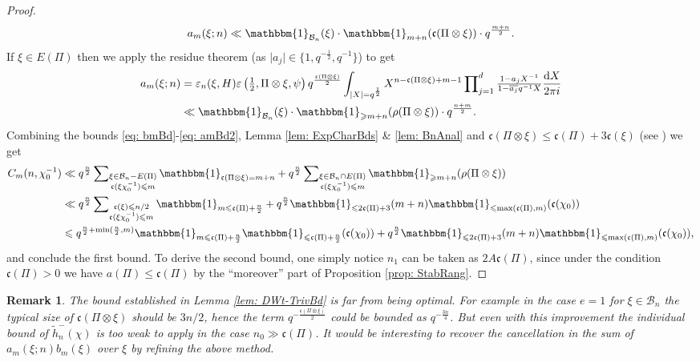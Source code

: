 \documentclass[A4]{amsart}
\def\leq{\leqslant}
\def\geq{\geqslant}
\newtheorem{remark} [theorem] {Remark}
\numberwithin{equation}{section} \everymath{\displaystyle}
\newcommand{\id}{\mathbbm{1}}
\newcommand{\ud}{\mathrm{d}}
\newcommand{\norm}[1][\cdot]{\lvert #1 \rvert}
\newcommand{\cond}{\mathfrak{c}}
\newcommand{\condL}{\mathfrak{\rho}}
\begin{document}
\begin{proof}
\begin{equation} \label{eq: amBd1} 
	a_m(\xi;n) \ll \id_{\mathcal{B}_n}(\xi) \cdot \id_{m+n}(\cond(\Pi \otimes \xi)) \cdot q^{\frac{m+n}{2}}. 
\end{equation}
	If $\xi \in E(\Pi)$ then we apply the residue theorem (as $\norm[a_j] \in \{ 1, q^{-\frac{1}{2}}, q^{-1} \}$) to get
\begin{align}
	a_m(\xi;n) &= \varepsilon_n(\xi, H) \varepsilon \left( \tfrac{1}{2}, \Pi \otimes \xi, \psi \right) q^{\frac{\cond(\Pi \otimes \xi)}{2}} \int_{\norm[X]=q^{\frac{1}{2}}} X^{n-\cond(\Pi \otimes \xi)+m-1} \sideset{}{_{j=1}^d} \prod \tfrac{1-a_j X^{-1}}{1-\overline{a_j}q^{-1}X} \frac{\ud X}{2\pi i} \nonumber \\
	&\ll \id_{\mathcal{B}_n}(\xi) \cdot \id_{\geq m+n}(\condL(\Pi \otimes \xi)) \cdot q^{\frac{n+m}{2}}. \label{eq: amBd2}
\end{align}
	Combining the bounds \eqref{eq: bmBd}-\eqref{eq: amBd2}, Lemma \ref{lem: ExpCharBds} \& \ref{lem: BnAnal} and $\cond(\Pi \otimes \xi) \leq \cond(\Pi)+3\cond(\xi)$ (see \cite{BuH97}) we get
\begin{align*}
	C_m(n,\chi_0^{-1}) &\ll q^{\frac{n}{2}} \sideset{}{_{\substack{\xi \in \mathcal{B}_n - E(\Pi) \\ \cond(\xi \chi_0^{-1}) \leq m}}} \sum \id_{\cond(\Pi \otimes \xi) = m+n} + q^{\frac{n}{2}} \sideset{}{_{\substack{\xi \in \mathcal{B}_n \cap E(\Pi) \\ \cond(\xi \chi_0^{-1}) \leq m}}} \sum \id_{\geq m+n}(\condL(\Pi \otimes \xi)) \\
	&\ll q^{\frac{n}{2}} \sideset{}{_{\substack{\cond(\xi) \leq n/2 \\ \cond(\xi \chi_0^{-1}) \leq m}}} \sum \id_{m \leq \cond(\Pi)+\frac{n}{2}} + q^{\frac{n}{2}} \id_{\leq 2\cond(\Pi)+3}(m+n) \id_{\leq \max(\cond(\Pi),m)}(\cond(\chi_0)) \\
	&\leq q^{\frac{n}{2}+\min(\frac{n}{2},m)} \id_{m \leq \cond(\Pi)+\frac{n}{2}} \id_{\leq \cond(\Pi)+\frac{n}{2}}(\cond(\chi_0)) + q^{\frac{n}{2}} \id_{\leq 2\cond(\Pi)+3}(m+n) \id_{\leq \max(\cond(\Pi),m)}(\cond(\chi_0)),
\end{align*}
	and conclude the first bound. To derive the second bound, one simply notice $n_1$ can be taken as $2A\cond(\Pi)$, since under the condition $\cond(\Pi) > 0$ we have $a(\Pi) \leq \cond(\Pi)$ by the ``moreover'' part of Proposition \ref{prop: StabRang}.
\end{proof}

\begin{remark}
	The bound established in Lemma \ref{lem: DWt-TrivBd} is far from being optimal. For example in the case $e=1$ for $\xi \in \mathcal{B}_n$ the typical size of $\cond(\Pi \otimes \xi)$ should be $3n/2$, hence the term $q^{-\frac{\cond(\Pi \otimes \xi)}{2}}$ could be bounded as $q^{-\frac{3n}{4}}$. But even with this improvement the individual bound of $\widetilde{h}_n^-(\chi)$ is too weak to apply in the case $n_0 \gg \cond(\Pi)$. It would be interesting to recover the cancellation in the sum of $a_m(\xi;n) b_m(\xi)$ over $\xi$ by refining the above method.
\end{remark}
\end{document}
